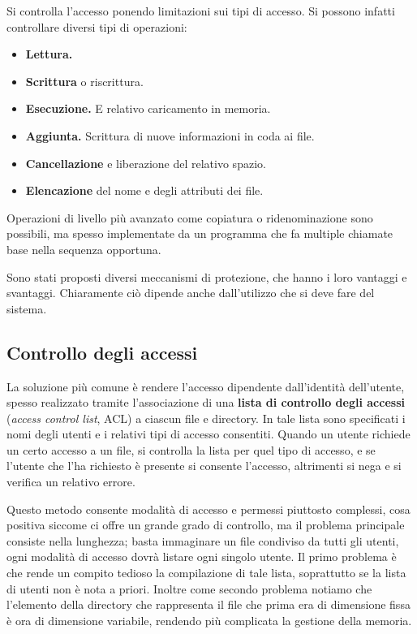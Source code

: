         Si controlla l'accesso ponendo limitazioni sui tipi di accesso. Si possono infatti controllare diversi tipi di operazioni:
        \begin{itemize}
            \item \textbf{Lettura.}
            
            \item \textbf{Scrittura} o riscrittura.
            
            \item \textbf{Esecuzione.} E relativo caricamento in memoria.
            
            \item \textbf{Aggiunta.} Scrittura di nuove informazioni in coda ai file.
            
            \item \textbf{Cancellazione} e liberazione del relativo spazio.
            
            \item \textbf{Elencazione} del nome e degli attributi dei file.
        \end{itemize}
        
        Operazioni di livello più avanzato come copiatura o ridenominazione sono possibili, ma spesso implementate da un programma che fa multiple chiamate base nella sequenza opportuna.
        
        Sono stati proposti diversi meccanismi di protezione, che hanno i loro vantaggi e svantaggi. Chiaramente ciò dipende anche dall'utilizzo che si deve fare del sistema.
        
    \subsection{Controllo degli accessi}
        La soluzione più comune è rendere l'accesso dipendente dall'identità dell'utente, spesso realizzato tramite l'associazione di una \textbf{lista di controllo degli accessi} (\textit{access control list}, ACL) a ciascun file e directory. In tale lista sono specificati i nomi degli utenti e i relativi tipi di accesso consentiti. Quando un utente richiede un certo accesso a un file, si controlla la lista per quel tipo di accesso, e se l'utente che l'ha richiesto è presente si consente l'accesso, altrimenti si nega e si verifica un relativo errore.
        
        Questo metodo consente modalità di accesso e permessi piuttosto complessi, cosa positiva siccome ci offre un grande grado di controllo, ma il problema principale consiste nella lunghezza; basta immaginare un file condiviso da tutti gli utenti, ogni modalità di accesso dovrà listare ogni singolo utente. Il primo problema è che rende un compito tedioso la compilazione di tale lista, soprattutto se la lista di utenti non è nota a priori. Inoltre come secondo problema notiamo che l'elemento della directory che rappresenta il file che prima era di dimensione fissa è ora di dimensione variabile, rendendo più complicata la gestione della memoria.
        
